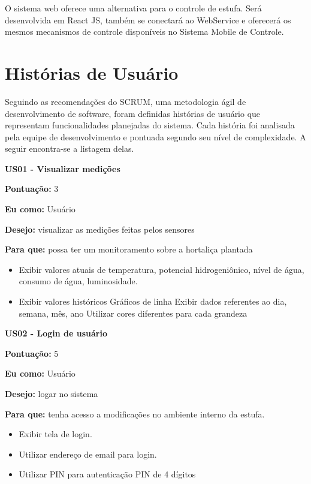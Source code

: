 O sistema web oferece uma alternativa para o controle de estufa. Será desenvolvida em React JS, também se conectará ao WebService e oferecerá os mesmos mecanismos de controle disponíveis no Sistema Mobile de Controle.

\section{Histórias de Usuário}

Seguindo as recomendações do SCRUM, uma metodologia ágil de desenvolvimento de software, foram definidas histórias de usuário que representam funcionalidades planejadas do sistema. Cada história foi analisada pela equipe de desenvolvimento e pontuada segundo seu nível de complexidade. A seguir encontra-se a listagem delas. 

\textbf{US01 - Visualizar medições}

\textbf{Pontuação:} 3

\textbf{Eu como:} Usuário

\textbf{Desejo:} visualizar as medições feitas pelos sensores

\textbf{Para que:} possa ter um monitoramento sobre a hortaliça plantada

\begin{itemize}
	\item Exibir valores atuais de temperatura, potencial hidrogeniônico, nível de água, consumo de água, luminosidade.
	\item Exibir valores históricos
		\subitem Gráficos de linha
		\subitem Exibir dados referentes ao dia, semana, mês, ano
		\subitem Utilizar cores diferentes para cada grandeza
\end{itemize}

\textbf{US02 - Login de usuário}

\textbf{Pontuação:} 5

\textbf{Eu como:} Usuário

\textbf{Desejo:} logar no sistema

\textbf{Para que:} tenha acesso a modificações no ambiente interno da estufa.

\begin{itemize}
	\item Exibir tela de login.
	\item Utilizar endereço de email para login.
	\item Utilizar PIN para autenticação
		\subitem PIN de 4 dígitos
\end{itemize}

